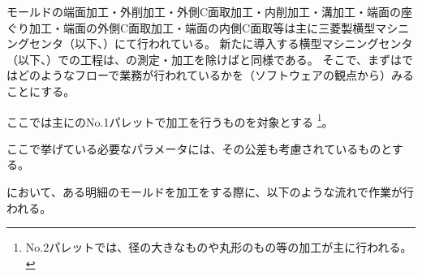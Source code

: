 

モールドの端面加工・外削加工・外側C面取加工・内削加工・溝加工・端面の座ぐり加工・端面の外側C面取加工・端面の内側C面取等は主に三菱製横型マシニングセンタ（以下、\textbf{\MMname}）にて行われている。
新たに導入する横型マシニングセンタ（以下、\textbf{\DMname}）での工程は、\dimple の測定・加工を除けば\MMname と同様である。
そこで、まずは\MMname ではどのようなフローで業務が行われているかを（ソフトウェアの観点から）みることにする。
\begin{marker}
ここでは主に\MMname のNo.1パレットで加工を行うものを対象とする
\footnote{No.2パレットでは、径の大きなものや丸形のもの等の加工が主に行われる。}。
\end{marker}
\begin{marker}
ここで挙げている必要なパラメータには、その公差も考慮されているものとする。
\end{marker}



\MMname において、ある明細のモールドを加工をする際に、以下のような流れで作業が行われる。


